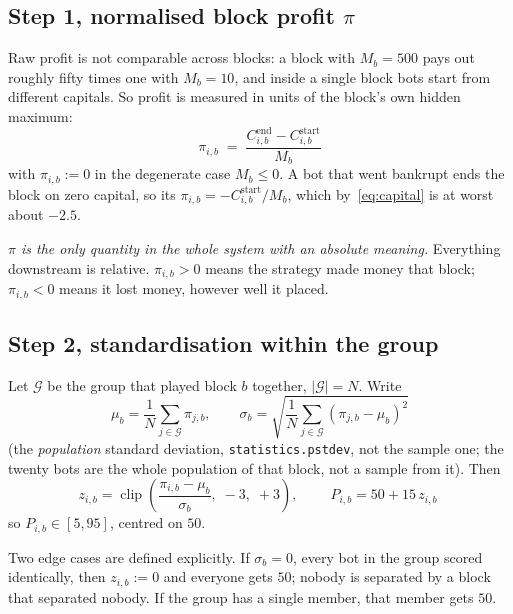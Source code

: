 \documentclass[11pt,a4paper]{article}
\newcommand{\code}[1]{\texttt{\small #1}}
\newcommand{\clipf}{\operatorname{clip}}
\begin{document}
\subsection{Step 1, normalised block profit \texorpdfstring{$\pi$}{pi}}
\label{sec:pi}
Raw profit is not comparable across blocks: a block with $M_b = 500$ pays out
roughly fifty times one with $M_b = 10$, and inside a single block bots start
from different capitals. So profit is measured in units of the block's own
hidden maximum:
\begin{equation}
  \boxed{\;
  \pi_{i,b} \;=\; \frac{C^{\text{end}}_{i,b} - C^{\text{start}}_{i,b}}{M_b}
  \;}
  \label{eq:pi}
\end{equation}
with $\pi_{i,b} := 0$ in the degenerate case $M_b \le 0$. A bot that went
bankrupt ends the block on zero capital, so its
$\pi_{i,b} = -C^{\text{start}}_{i,b} / M_b$, which
by~\eqref{eq:capital} is at worst about $-2.5$.

\emph{$\pi$ is the only quantity in the whole system with an absolute meaning.}
Everything downstream is relative. $\pi_{i,b} > 0$ means the strategy made money
that block; $\pi_{i,b} < 0$ means it lost money, however well it placed.

\subsection{Step 2, standardisation within the group}
\label{sec:points}
Let $\mathcal{G}$ be the group that played block $b$ together, $|\mathcal{G}| = N$.
Write
\begin{equation}
  \mu_b = \frac{1}{N}\sum_{j \in \mathcal{G}} \pi_{j,b},
  \qquad
  \sigma_b = \sqrt{\frac{1}{N}\sum_{j \in \mathcal{G}} (\pi_{j,b} - \mu_b)^2}
\end{equation}
(the \emph{population} standard deviation, \code{statistics.pstdev}, not
the sample one; the twenty bots are the whole population of that block, not a
sample from it). Then
\begin{equation}
  z_{i,b} = \clipf\!\left(\frac{\pi_{i,b} - \mu_b}{\sigma_b},\; -3,\; +3\right),
  \qquad
  \boxed{\; P_{i,b} = 50 + 15\, z_{i,b} \;}
  \label{eq:points}
\end{equation}
so $P_{i,b} \in [5, 95]$, centred on $50$.

Two edge cases are defined explicitly. If $\sigma_b = 0$, every bot in the
group scored identically, then $z_{i,b} := 0$ and everyone gets $50$; nobody
is separated by a block that separated nobody. If the group has a single member,
that member gets $50$.
\end{document}
